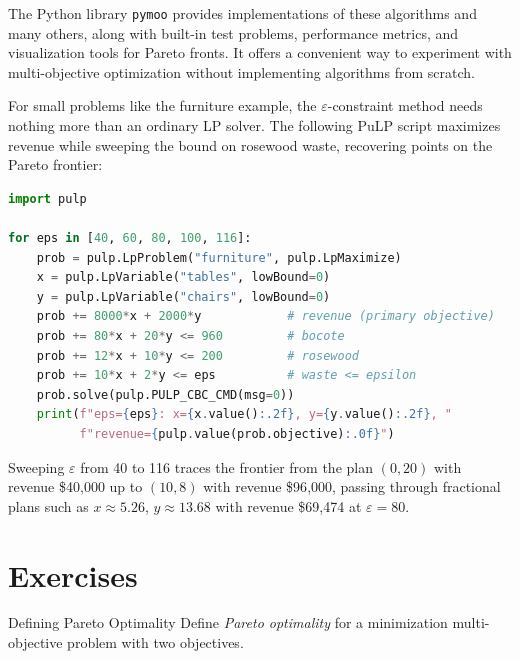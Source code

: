 The Python library \texttt{pymoo} provides implementations of these algorithms and many others, along with built-in test problems, performance metrics, and visualization tools for Pareto fronts. It offers a convenient way to experiment with multi-objective optimization without implementing algorithms from scratch.

For small problems like the furniture example, the $\varepsilon$-constraint method needs nothing more than an ordinary LP solver. The following PuLP script maximizes revenue while sweeping the bound on rosewood waste, recovering points on the Pareto frontier:

\begin{lstlisting}[language=Python]
import pulp

for eps in [40, 60, 80, 100, 116]:
    prob = pulp.LpProblem("furniture", pulp.LpMaximize)
    x = pulp.LpVariable("tables", lowBound=0)
    y = pulp.LpVariable("chairs", lowBound=0)
    prob += 8000*x + 2000*y            # revenue (primary objective)
    prob += 80*x + 20*y <= 960         # bocote
    prob += 12*x + 10*y <= 200         # rosewood
    prob += 10*x + 2*y <= eps          # waste <= epsilon
    prob.solve(pulp.PULP_CBC_CMD(msg=0))
    print(f"eps={eps}: x={x.value():.2f}, y={y.value():.2f}, "
          f"revenue={pulp.value(prob.objective):.0f}")
\end{lstlisting}

Sweeping $\varepsilon$ from 40 to 116 traces the frontier from the plan $(0,20)$ with revenue \$40{,}000 up to $(10,8)$ with revenue \$96{,}000, passing through fractional plans such as $x \approx 5.26$, $y \approx 13.68$ with revenue \$69{,}474 at $\varepsilon = 80$.

\section{Exercises}


\begin{ex}{Defining Pareto Optimality}{}
\label{ex:pareto-def}
Define \emph{Pareto optimality} for a minimization multi-objective problem with two objectives.
\end{ex}

